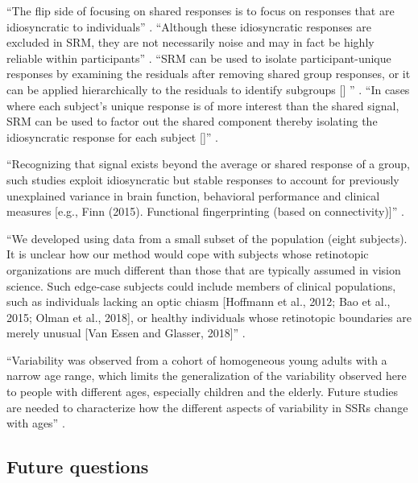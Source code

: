 ``The flip side of focusing on shared responses is to focus on responses that
are idiosyncratic to individuals'' \citep{cohen2017computational}.
%
``Although these idiosyncratic responses are excluded in SRM, they are not
necessarily noise and may in fact be highly reliable within participants''
\citep{cohen2017computational}.
%
``SRM can be used to isolate participant-unique responses by examining the
residuals after removing shared group responses, or it can be applied
hierarchically to the residuals to identify subgroups [\citet{chen2017shared}]
'' \citep{cohen2017computational}.
%
``In cases where each subject's unique response is of more interest than the
shared signal, SRM can be used to factor out the shared component thereby
isolating the idiosyncratic response for each subject
[\citep{chen2015reduced}]'' \citep{kumar2020brainiak}.

%
``Recognizing that signal exists beyond the average or shared response of a
group, such studies exploit idiosyncratic but stable responses to account for
previously unexplained variance in brain function, behavioral performance and
clinical measures [e.g., Finn (2015). Functional fingerprinting (based on
connectivity)]'' \citep{cohen2017computational}.


``We developed using data from a small subset of the population (eight
subjects).
%
It is unclear how our method would cope with subjects whose retinotopic
organizations are much different than those that are typically assumed in vision
science.
%
Such edge-case subjects could include members of clinical populations, such as
individuals lacking an optic chiasm [Hoffmann et al., 2012; Bao et al., 2015;
Olman et al., 2018], or healthy individuals whose retinotopic boundaries are
merely unusual [Van Essen and Glasser, 2018]'' \citep{benson2018bayesian}.

``Variability was observed from a cohort of homogeneous young adults with a
narrow age range, which limits the generalization of the variability observed
here to people with different ages, especially children and the elderly.
%
Future studies are needed to characterize how the different aspects of
variability in SSRs change with ages'' \citet{zhen2017quantifying}.



\subsection{Future questions}


